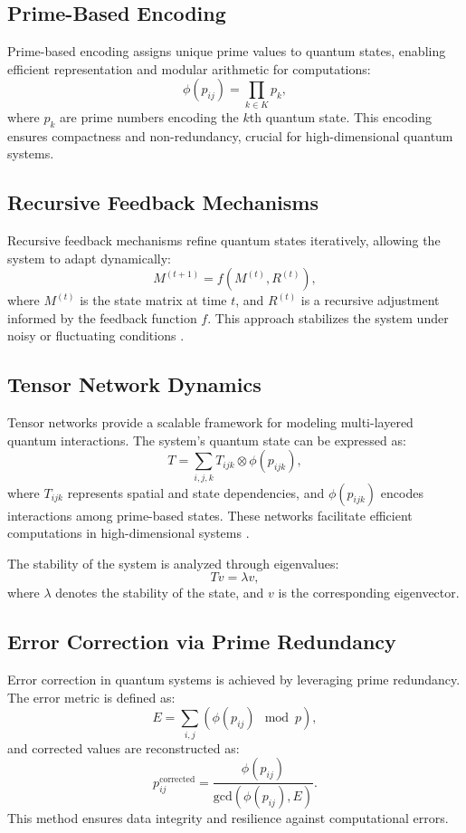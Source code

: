 \documentclass{article}
\theoremstyle{plain}
\begin{document}
\subsection{Prime-Based Encoding}
Prime-based encoding assigns unique prime values to quantum states, enabling efficient representation and modular arithmetic for computations:
\begin{equation}
\phi(p_{ij}) = \prod_{k \in K} p_k,
\end{equation}
where $p_k$ are prime numbers encoding the $k$th quantum state. This encoding ensures compactness and non-redundancy, crucial for high-dimensional quantum systems.

\subsection{Recursive Feedback Mechanisms}
Recursive feedback mechanisms refine quantum states iteratively, allowing the system to adapt dynamically:
\begin{equation}
M^{(t+1)} = f(M^{(t)}, R^{(t)}),
\end{equation}
where $M^{(t)}$ is the state matrix at time $t$, and $R^{(t)}$ is a recursive adjustment informed by the feedback function $f$. This approach stabilizes the system under noisy or fluctuating conditions \cite{wolfram2020feedback}.

\subsection{Tensor Network Dynamics}
Tensor networks provide a scalable framework for modeling multi-layered quantum interactions. The system’s quantum state can be expressed as:
\begin{equation}
T = \sum_{i,j,k} T_{ijk} \otimes \phi(p_{ijk}),
\end{equation}
where $T_{ijk}$ represents spatial and state dependencies, and $\phi(p_{ijk})$ encodes interactions among prime-based states. These networks facilitate efficient computations in high-dimensional systems \cite{biamonte2017tensor}.

The stability of the system is analyzed through eigenvalues:
\begin{equation}
T v = \lambda v,
\end{equation}
where $\lambda$ denotes the stability of the state, and $v$ is the corresponding eigenvector.

\subsection{Error Correction via Prime Redundancy}
Error correction in quantum systems is achieved by leveraging prime redundancy. The error metric is defined as:
\begin{equation}
E = \sum_{i,j} \left( \phi(p_{ij}) \mod p \right),
\end{equation}
and corrected values are reconstructed as:
\begin{equation}
p_{ij}^{\text{corrected}} = \frac{\phi(p_{ij})}{\text{gcd}(\phi(p_{ij}), E)}.
\end{equation}
This method ensures data integrity and resilience against computational errors.
\end{document}
